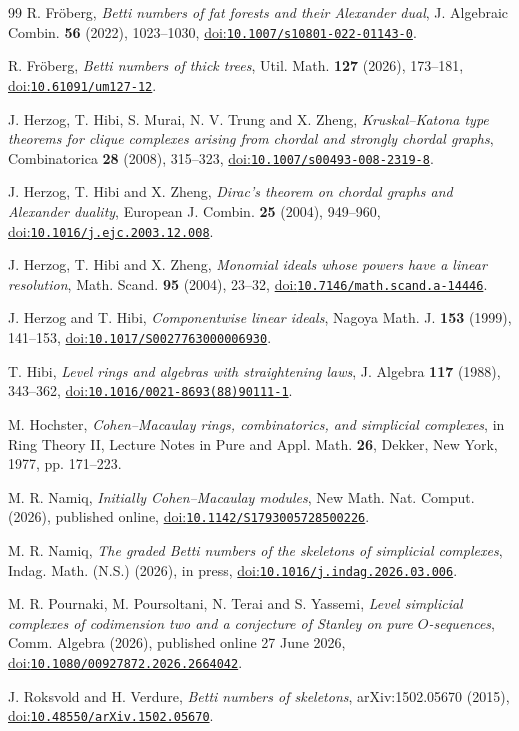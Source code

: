 \documentclass[11pt]{amsart}
\theoremstyle{definition}
\theoremstyle{remark}
\newcommand{\doi}[1]{\href{https://doi.org/#1}{doi:\nolinkurl{#1}}}
\begin{document}
\begin{thebibliography}{99}
		R. Fr\"oberg, \emph{Betti numbers of fat forests and their Alexander dual}, J. Algebraic Combin. \textbf{56} (2022), 1023--1030, \doi{10.1007/s10801-022-01143-0}.
		
		R. Fr\"oberg, \emph{Betti numbers of thick trees}, Util. Math. \textbf{127} (2026), 173--181, \doi{10.61091/um127-12}.
		
		J. Herzog, T. Hibi, S. Murai, N. V. Trung and X. Zheng, \emph{Kruskal--Katona type theorems for clique complexes arising from chordal and strongly chordal graphs}, Combinatorica \textbf{28} (2008), 315--323, \doi{10.1007/s00493-008-2319-8}.
		
		J. Herzog, T. Hibi and X. Zheng, \emph{Dirac's theorem on chordal graphs and Alexander duality}, European J. Combin. \textbf{25} (2004), 949--960, \doi{10.1016/j.ejc.2003.12.008}.
		
		J. Herzog, T. Hibi and X. Zheng, \emph{Monomial ideals whose powers have a linear resolution}, Math. Scand. \textbf{95} (2004), 23--32, \doi{10.7146/math.scand.a-14446}.
		
		J. Herzog and T. Hibi, \emph{Componentwise linear ideals}, Nagoya Math. J. \textbf{153} (1999), 141--153, \doi{10.1017/S0027763000006930}.
		
		T. Hibi, \emph{Level rings and algebras with straightening laws}, J. Algebra \textbf{117} (1988), 343--362, \doi{10.1016/0021-8693(88)90111-1}.
		
		M. Hochster, \emph{Cohen--Macaulay rings, combinatorics, and simplicial complexes}, in Ring Theory II, Lecture Notes in Pure and Appl. Math. \textbf{26}, Dekker, New York, 1977, pp. 171--223.
		
		M. R. Namiq, \emph{Initially Cohen--Macaulay modules}, New Math. Nat. Comput. (2026), published online, \doi{10.1142/S1793005728500226}.
		
		M. R. Namiq, \emph{The graded Betti numbers of the skeletons of simplicial complexes}, Indag. Math. (N.S.) (2026), in press, \doi{10.1016/j.indag.2026.03.006}.
		
		M. R. Pournaki, M. Poursoltani, N. Terai and S. Yassemi, \emph{Level simplicial complexes of codimension two and a conjecture of Stanley on pure $O$-sequences}, Comm. Algebra (2026), published online 27 June 2026, \doi{10.1080/00927872.2026.2664042}.
		
		J. Roksvold and H. Verdure, \emph{Betti numbers of skeletons}, arXiv:1502.05670 (2015), \doi{10.48550/arXiv.1502.05670}.
		
	\end{thebibliography}
\end{document}
